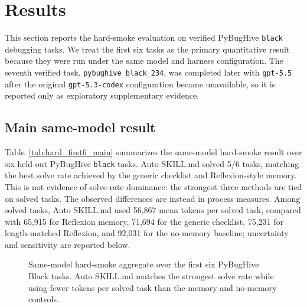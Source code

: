 \section{Results}
\label{sec:results}

This section reports the hard-smoke evaluation on verified PyBugHive \texttt{black} debugging tasks. We treat the first six tasks as the primary quantitative result because they were run under the same model and harness configuration. The seventh verified task, \texttt{pybughive\_black\_234}, was completed later with \texttt{gpt-5.5} after the original \texttt{gpt-5.3-codex} configuration became unavailable, so it is reported only as exploratory supplementary evidence.

\subsection{Main same-model result}
\label{sec:results_main}

Table~\ref{tab:hard_first6_main} summarizes the same-model hard-smoke result over six held-out PyBugHive \texttt{black} tasks. Auto SKILL.md solved 5/6 tasks, matching the best solve rate achieved by the generic checklist and Reflexion-style memory. This is not evidence of solve-rate dominance: the strongest three methods are tied on solved tasks. The observed differences are instead in process measures. Among solved tasks, Auto SKILL.md used 56,867 mean tokens per solved task, compared with 65,915 for Reflexion memory, 71,694 for the generic checklist, 75,231 for length-matched Reflexion, and 92,031 for the no-memory baseline; uncertainty and sensitivity are reported below.

\FloatBarrier


\begin{figure}[t]
\centering

\caption{Same-model hard-smoke aggregate over the first six PyBugHive Black tasks. Auto SKILL.md matches the strongest solve rate while using fewer tokens per solved task than the memory and no-memory controls.}
\label{fig:hard_first6_main_bars}
\end{figure}

